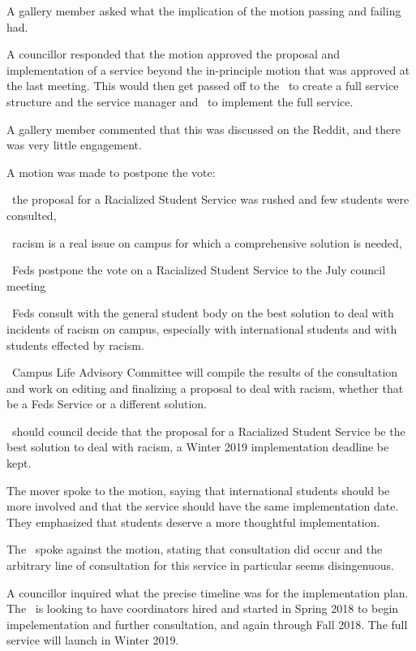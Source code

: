 \begin{motion}
    A gallery member asked what the implication of the motion passing
    and failing had.

    A councillor responded that the motion approved the proposal and
    implementation of a service beyond the in-principle motion that was
    approved at the last meeting. This would then get passed off to the \vpi\
    to create a full service structure and the service manager and \clac\ to
    implement the full service.

    A gallery member commented that this was discussed on the Reddit, and there
    was very little engagement.

    A motion was made to postpone the vote:

    \begin{motion}
        \whereas\ the proposal for a Racialized Student Service was rushed and
        few students were consulted,

        \whereas\ racism is a real issue on campus for which a comprehensive
        solution is needed,

        \birt\ Feds postpone the vote on a Racialized Student Service to the
        July council meeting

        \bifrt\ Feds consult with the general student body on the best solution
        to deal with incidents of racism on campus, especially with
        international students and with students effected by racism.

        \bifrt\ Campus Life Advisory Committee will compile the results of the
        consultation and work on editing and finalizing a proposal to deal with
        racism, whether that be a Feds Service or a different solution.

        \bifrt\ should council decide that the proposal for a Racialized
        Student Service be the best solution to deal with racism, a Winter 2019
        implementation deadline be kept.
        \movers{\alexander}{\seneca}

        The mover spoke to the motion, saying that international students
        should be more involved and that the service should have the same
        implementation date. They emphasized that students deserve a more
        thoughtful implementation.

        The \pres\ spoke against the motion, stating that consultation did
        occur and the arbitrary line of consultation for this service in
        particular seems disingenuous.

        A councillor inquired what the precise timeline was for the 
        implementation plan. The \vpi\ is looking to have coordinators hired
        and started in Spring 2018 to begin impelementation and further
        consultation, and again through Fall 2018. The full service will launch
        in Winter 2019.


\end{motion}
\end{motion}
